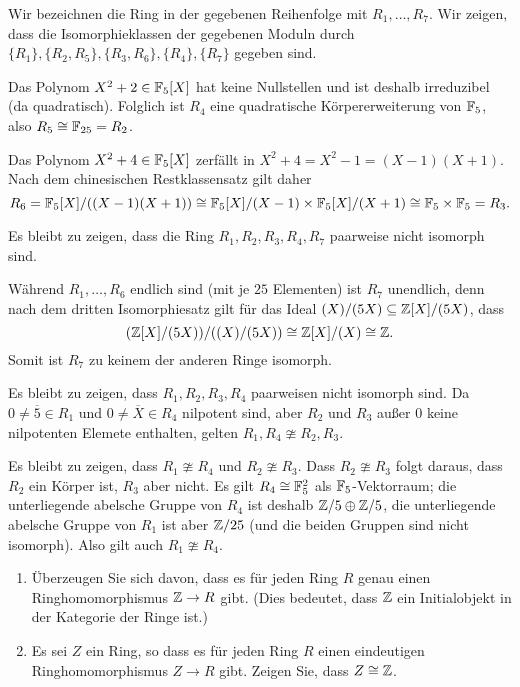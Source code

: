 \begin{solution}
  Wir bezeichnen die Ring in der gegebenen Reihenfolge mit $R_1, \dotsc, R_7$.
  Wir zeigen, dass die Isomorphieklassen der gegebenen Moduln durch $\{R_1\}, \{R_2, R_5\}, \{R_3, R_6\}, \{R_4\}, \{R_7\}$ gegeben sind.
  
  Das Polynom $X^2 + 2 \in \mathbb{F}_5[X]$ hat keine Nullstellen und ist deshalb irreduzibel (da quadratisch).
  Folglich ist $R_4$ eine quadratische Körpererweiterung von $\mathbb{F}_5$, also $R_5 \cong \mathbb{F}_{25} = R_2$.
  
  Das Polynom $X^2 + 4 \in \mathbb{F}_5[X]$ zerfällt in $X^2 + 4 = X^2 - 1 = (X-1)(X+1)$.
  Nach dem chinesischen Restklassensatz gilt daher
  \[
          R_6
    =     \mathbb{F}_5[X]/((X-1)(X+1))
    \cong \mathbb{F}_5[X]/(X-1) \times \mathbb{F}_5[X]/(X+1)
    \cong \mathbb{F}_5 \times \mathbb{F}_5
    =     R_3.
  \]
  
  Es bleibt zu zeigen, dass die Ring $R_1, R_2, R_3, R_4, R_7$ paarweise nicht isomorph sind.
  
  Während $R_1, \dotsc, R_6$ endlich sind (mit je $25$ Elementen) ist $R_7$ unendlich, denn nach dem dritten Isomorphiesatz gilt für das Ideal $(X)/(5X) \subseteq \mathbb{Z}[X]/(5X)$, dass
  \[
           (\mathbb{Z}[X]/(5X))/((X)/(5X))
    \cong \mathbb{Z}[X]/(X)
    \cong \mathbb{Z}.
  \]
  Somit ist $R_7$ zu keinem der anderen Ringe isomorph.
  
  Es bleibt zu zeigen, dass $R_1, R_2, R_3, R_4$ paarweisen nicht isomorph sind.
  Da $0 \neq \overline{5} \in R_1$ und $0 \neq \overline{X} \in R_4$ nilpotent sind, aber $R_2$ und $R_3$ außer $0$ keine nilpotenten Elemete enthalten, gelten $R_1, R_4 \ncong R_2, R_3$.
  
  Es bleibt zu zeigen, dass $R_1 \ncong R_4$ und $R_2 \ncong R_3$.
  Dass $R_2 \ncong R_3$ folgt daraus, dass $R_2$ ein Körper ist, $R_3$ aber nicht.
  Es gilt $R_4 \cong \mathbb{F}_5^2$ als $\mathbb{F}_5$-Vektorraum;
  die unterliegende abelsche Gruppe von $R_4$ ist deshalb $\mathbb{Z}/5 \oplus \mathbb{Z}/5$, die unterliegende abelsche Gruppe von $R_1$ ist aber $\mathbb{Z}/25$ (und die beiden Gruppen sind nicht isomorph).
  Also gilt auch $R_1 \ncong R_4$.
\end{solution}


\begin{question}[subtitle = Initialobjekte in der Kategorie der Ringe]
  \label{qst: Z is inital}
  \begin{enumerate}
    \item
      Überzeugen Sie sich davon, dass es für jeden Ring $R$ genau einen Ringhomomorphismus $\mathbb{Z} \to R$ gibt.
      (Dies bedeutet, dass $\mathbb{Z}$ ein Initialobjekt in der Kategorie der Ringe ist.)
    \item
      Es sei $Z$ ein Ring, so dass es für jeden Ring $R$ einen eindeutigen Ringhomomorphismus $Z \to R$ gibt.
      Zeigen Sie, dass $Z \cong \mathbb{Z}$.
  \end{enumerate}
\end{question}


